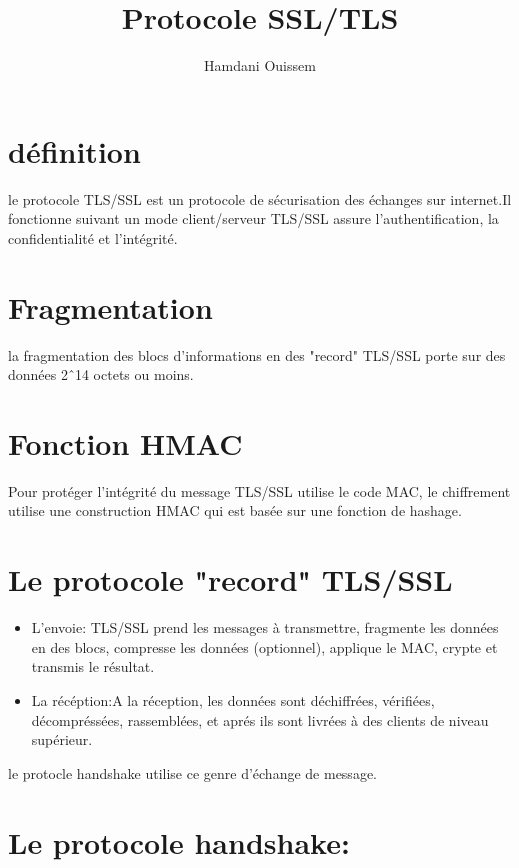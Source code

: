 \documentclass[11pt]{article}
\title{\textbf{Protocole SSL/TLS}}
\author{Hamdani Ouissem\\
	}
\date{}
\begin{document}
\maketitle

\section{définition}
le protocole TLS/SSL est un protocole de sécurisation des échanges sur internet.Il fonctionne suivant un mode client/serveur
TLS/SSL assure l'authentification, la confidentialité et l'intégrité.
\section{Fragmentation}
la fragmentation des blocs d'informations en des "record" TLS/SSL porte sur des données 2\^\ 14 octets ou moins.
\section {Fonction HMAC}
Pour protéger l'intégrité du message TLS/SSL utilise le code MAC,
le chiffrement utilise une construction HMAC qui est basée sur une fonction de hashage.
\section{Le protocole "record" TLS/SSL}
\begin{itemize}
\item L'envoie:
TLS/SSL prend les messages à transmettre, fragmente les données en des blocs, compresse les données (optionnel), applique le MAC, crypte et transmis le résultat. 
\item
La récéption:A la réception, les données sont déchiffrées, vérifiées, décompréssées, rassemblées, et aprés ils sont livrées à des clients de niveau supérieur.
\end{itemize}
le protocle handshake utilise ce genre d'échange de message.
\section{Le protocole handshake:}
\end{document}
